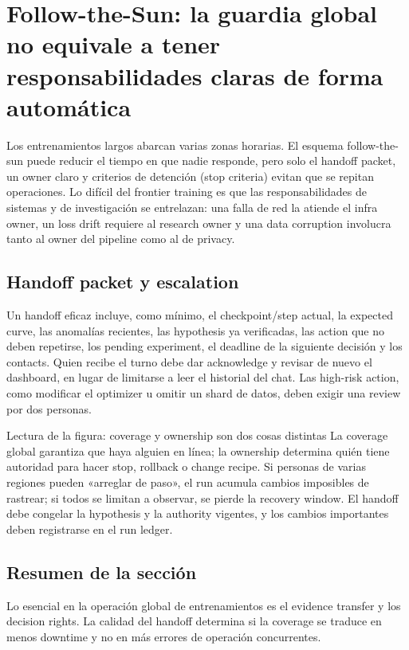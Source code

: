 \section{Follow-the-Sun: la guardia global no equivale a tener responsabilidades claras de forma automática}

Los entrenamientos largos abarcan varias zonas horarias. El esquema follow-the-sun puede reducir el tiempo en que nadie responde, pero solo el handoff packet, un owner claro y criterios de detención (stop criteria) evitan que se repitan operaciones. Lo difícil del frontier training es que las responsabilidades de sistemas y de investigación se entrelazan: una falla de red la atiende el infra owner, un loss drift requiere al research owner y una data corruption involucra tanto al owner del pipeline como al de privacy.

\subsection{Handoff packet y escalation}

Un handoff eficaz incluye, como mínimo, el checkpoint/step actual, la expected curve, las anomalías recientes, las hypothesis ya verificadas, las action que no deben repetirse, los pending experiment, el deadline de la siguiente decisión y los contacts. Quien recibe el turno debe dar acknowledge y revisar de nuevo el dashboard, en lugar de limitarse a leer el historial del chat. Las high-risk action, como modificar el optimizer u omitir un shard de datos, deben exigir una review por dos personas.


\begin{knowledgebox}{Lectura de la figura: coverage y ownership son dos cosas distintas}
La coverage global garantiza que haya alguien en línea; la ownership determina quién tiene autoridad para hacer stop, rollback o change recipe. Si personas de varias regiones pueden «arreglar de paso», el run acumula cambios imposibles de rastrear; si todos se limitan a observar, se pierde la recovery window. El handoff debe congelar la hypothesis y la authority vigentes, y los cambios importantes deben registrarse en el run ledger.
\end{knowledgebox}


\subsection{Resumen de la sección}

Lo esencial en la operación global de entrenamientos es el evidence transfer y los decision rights. La calidad del handoff determina si la coverage se traduce en menos downtime y no en más errores de operación concurrentes.
